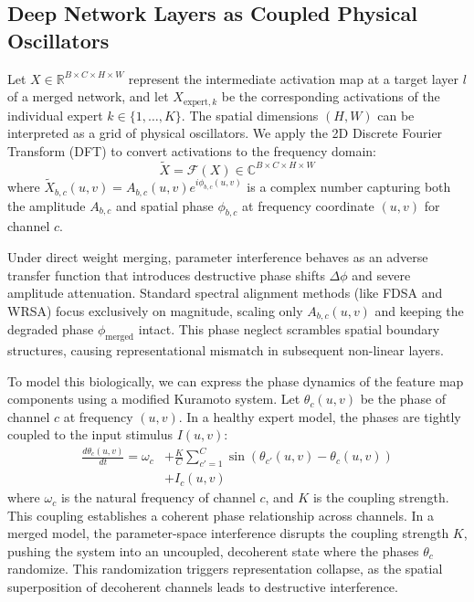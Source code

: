 \documentclass{article}
\theoremstyle{plain}
\theoremstyle{definition}
\theoremstyle{remark}
\begin{document}
\subsection{Deep Network Layers as Coupled Physical Oscillators}
Let $X \in \mathbb{R}^{B \times C \times H \times W}$ represent the intermediate activation map at a target layer $l$ of a merged network, and let $X_{\text{expert}, k}$ be the corresponding activations of the individual expert $k \in \{1, \dots, K\}$. The spatial dimensions $(H, W)$ can be interpreted as a grid of physical oscillators. We apply the 2D Discrete Fourier Transform (DFT) to convert activations to the frequency domain:
\begin{equation}
    \tilde{X} = \mathcal{F}(X) \in \mathbb{C}^{B \times C \times H \times W}
\end{equation}
where $\tilde{X}_{b, c}(u, v) = A_{b, c}(u, v) e^{i \phi_{b, c}(u, v)}$ is a complex number capturing both the amplitude $A_{b, c}$ and spatial phase $\phi_{b, c}$ at frequency coordinate $(u, v)$ for channel $c$. 

Under direct weight merging, parameter interference behaves as an adverse transfer function that introduces destructive phase shifts $\Delta \phi$ and severe amplitude attenuation. Standard spectral alignment methods (like FDSA and WRSA) focus exclusively on magnitude, scaling only $A_{b, c}(u, v)$ and keeping the degraded phase $\phi_{\text{merged}}$ intact. This phase neglect scrambles spatial boundary structures, causing representational mismatch in subsequent non-linear layers.

To model this biologically, we can express the phase dynamics of the feature map components using a modified Kuramoto system. Let $\theta_c(u,v)$ be the phase of channel $c$ at frequency $(u,v)$. In a healthy expert model, the phases are tightly coupled to the input stimulus $I(u,v)$:
\begin{align}
    \frac{d\theta_c(u,v)}{dt} = \omega_c &+ \frac{K}{C} \sum_{c'=1}^C \sin\left(\theta_{c'}(u,v) - \theta_c(u,v)\right) \nonumber \\
    &+ I_c(u,v)
\end{align}
where $\omega_c$ is the natural frequency of channel $c$, and $K$ is the coupling strength. This coupling establishes a coherent phase relationship across channels. In a merged model, the parameter-space interference disrupts the coupling strength $K$, pushing the system into an uncoupled, decoherent state where the phases $\theta_c$ randomize. This randomization triggers representation collapse, as the spatial superposition of decoherent channels leads to destructive interference.
\end{document}
